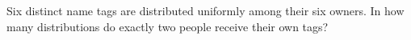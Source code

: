 Six distinct name tags are distributed uniformly among their six owners. In how many distributions do exactly two people receive their own tags?

